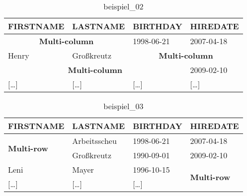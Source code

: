 \begin{table}[H]
  \begin{tabularx}{\textwidth}{X|X|X|X}
    \textbf{FIRSTNAME} & \textbf{LASTNAME} & \textbf{BIRTHDAY} & \textbf{HIREDATE} \\
    \hline\hline
    \multicolumn{2}{c|}{\textbf{Multi-column}} & 1998-06-21 & 2007-04-18 \\
    Henry & Großkreutz & \multicolumn{2}{c}{\textbf{Multi-column}} \\
    \multicolumn{3}{c|}{\textbf{Multi-column}} & 2009-02-10 \\
    $[$\dots$]$ & $[$\dots$]$ & $[$\dots$]$ & $[$\dots$]$ \\
  \end{tabularx}
  \caption{beispiel\_02}
  \label{tbl:beispiel_02}
\end{table}

\begin{table}[H]
  \ttfamily
  \begin{tabularx}{\textwidth}{X|X|X|X}
    \textbf{FIRSTNAME} & \textbf{LASTNAME} & \textbf{BIRTHDAY} & \textbf{HIREDATE} \\
    \hline\hline
    \multirow{2}{*}{\textbf{Multi-row}} & Arbeitsscheu & 1998-06-21 & 2007-04-18 \\
    & Großkreutz & 1990-09-01 & 2009-02-10 \\
    Leni & Mayer & 1996-10-15 & \multirow{2}{*}{\textbf{Multi-row}} \\
    $[$\dots$]$ & $[$\dots$]$ & $[$\dots$]$ & \\
    \hline
  \end{tabularx}
  \caption{beispiel\_03}
  \label{tbl:beispiel_03}
\end{table}